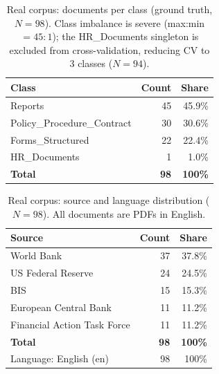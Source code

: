 
\begin{table}[t]
  \centering
  \caption{Real corpus: documents per class (ground truth, $N=98$).
  Class imbalance is severe (max:min $= 45{:}1$); the HR\_Documents singleton
  is excluded from cross-validation, reducing CV to 3 classes ($N=94$).}
  \label{tab:real-class-dist}
  \begin{tabular}{lrr}
    \toprule
    Class & Count & Share \\
    \midrule
    Reports                    & 45 & 45.9\% \\
    Policy\_Procedure\_Contract & 30 & 30.6\% \\
    Forms\_Structured          & 22 & 22.4\% \\
    HR\_Documents              &  1 &  1.0\% \\
    \midrule
    \textbf{Total}             & \textbf{98} & \textbf{100\%} \\
    \bottomrule
  \end{tabular}
\end{table}

\begin{table}[t]
  \centering
  \caption{Real corpus: source and language distribution ($N=98$).
  All documents are PDFs in English.}
  \label{tab:real-source-lang}
  \begin{tabular}{lrr}
    \toprule
    Source & Count & Share \\
    \midrule
    World Bank                   & 37 & 37.8\% \\
    US Federal Reserve           & 24 & 24.5\% \\
    BIS                          & 15 & 15.3\% \\
    European Central Bank        & 11 & 11.2\% \\
    Financial Action Task Force  & 11 & 11.2\% \\
    \midrule
    \textbf{Total}               & \textbf{98} & \textbf{100\%} \\
    \midrule
    Language: English (en)       & 98 & 100\% \\
    \bottomrule
  \end{tabular}
\end{table}

